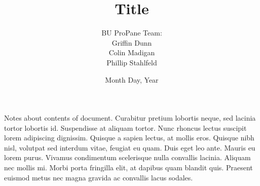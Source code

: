 \begin{titlepage}



\title{\textbf{Title}}
\author{BU ProPane Team:\\Griffin Dunn\\Colin Madigan\\Phillip Stahlfeld}
\date{Month Day, Year}
\maketitle



\noindent
Notes about contents of document. Curabitur pretium lobortis neque, sed lacinia tortor lobortis id. Suspendisse at aliquam tortor. Nunc rhoncus lectus suscipit lorem adipiscing dignissim. Quisque a sapien lectus, at mollis eros. Quisque nibh nisl, volutpat sed interdum vitae, feugiat eu quam. Duis eget leo ante. Mauris eu lorem purus. Vivamus condimentum scelerisque nulla convallis lacinia. Aliquam nec mollis mi. Morbi porta fringilla elit, at dapibus quam blandit quis. Praesent euismod metus nec magna gravida ac convallis lacus sodales.
\thispagestyle{empty}



\end{titlepage}